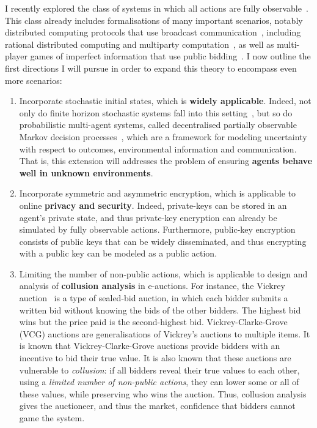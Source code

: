 \documentclass[a4paper,12pt]{scrartcl}
\begin{document}
I recently explored the class of systems in which all actions are fully observable~\cite{BLMR17IJCAI,BLMR17}. This class already includes 
formalisations of many important scenarios, notably distributed computing protocols that use broadcast communication~\cite{DBLP:books/mk/Lynch96}, including rational distributed computing and multiparty computation~\cite{ADGH06}, as well as multi-player games of imperfect information that use public bidding~\cite{Bowling145}. I now outline the first directions I will pursue in order to expand this theory to encompass even more scenarios:
\begin{enumerate}
 \item Incorporate stochastic initial states, which is \textbf{widely applicable}. Indeed, not only do finite horizon stochastic systems 
 fall into this setting~\cite{DBLP:conf/uai/LittmanDK95}, but so do probabilistic multi-agent systems, called decentralised partially observable Markov decision processes~\cite{DBLP:series/sbis/OliehoekA16}, which are a framework for modeling uncertainty with respect to outcomes, environmental information and communication.  That is, this extension will addresses the problem of ensuring \textbf{agents behave well in unknown environments}.
 
 \item Incorporate symmetric and asymmetric encryption, which is applicable to online \textbf{privacy and security}. Indeed, private-keys can be stored in an agent's private state, and thus private-key encryption can already be simulated by fully observable actions. Furthermore, public-key encryption consists of public keys that can be widely disseminated, and thus encrypting with a public key can be modeled as a public action. 
 
 \item Limiting the number of non-public actions, which is applicable to design and analysis of \textbf{collusion analysis} in e-auctions. For instance, the Vickrey auction~\cite{EasleyK10} is a type of sealed-bid auction, in which each bidder submits a written bid without knowing the bids of the other bidders. The highest bid wins but the price paid is the second-highest bid. Vickrey-Clarke-Grove (VCG) auctions are generalisations of Vickrey's
auctions to multiple items. It is known that Vickrey-Clarke-Grove auctions provide bidders with an incentive to bid their true value. It is also known that these auctions are vulnerable to \emph{collusion}: if all bidders reveal their true values to each other, using a \emph{limited number of non-public actions}, they can lower some or all of these values, while preserving who wins the auction. Thus, collusion analysis gives the auctioneer, and thus the market, confidence that bidders cannot game the system.


\end{enumerate}
\end{document}
